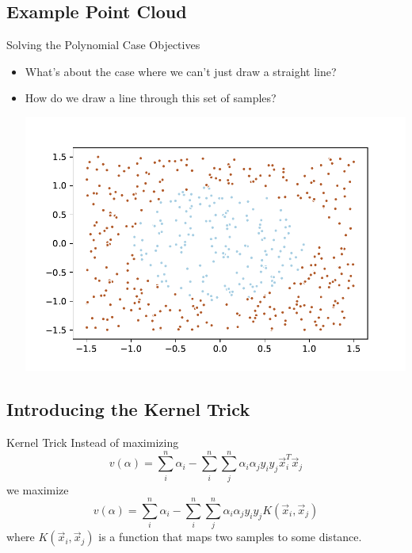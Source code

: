 \documentclass{beamer}
\begin{document}
\subsection{Example Point Cloud}
\begin{frame}{Solving the Polynomial Case}
Objectives
\begin{itemize}
\item What's about the case where we can't just draw a straight line?
\item How do we draw a line through this set of samples?
\begin{center}
\includegraphics[scale=.6]{poly.pdf}
\end{center}
\end{itemize}
\end{frame}

\subsection{Introducing the Kernel Trick}
\begin{frame}{Kernel Trick}
Instead of maximizing $$v(\alpha) = \sum_i^n \alpha_i - \sum_i^n\sum_j^n \alpha_i \alpha_j y_i y_j \vec{x}_i^T \vec{x}_j$$
we maximize 
$$v(\alpha) = \sum_i^n \alpha_i - \sum_i^n\sum_j^n \alpha_i \alpha_j y_i y_j K(\vec{x}_i, \vec{x}_j)$$
where $K(\vec{x}_i, \vec{x}_j)$ is a function that maps two samples to some distance.
\end{frame}
\end{document}
